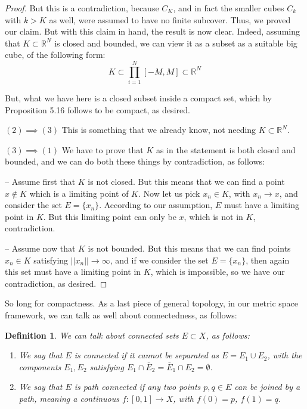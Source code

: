 \documentclass[12pt]{amsbook}
\newtheorem{definition}[theorem]{Definition}
\begin{document}
\begin{proof}
But this is a contradiction, because $C_K$, and in fact the smaller cubes $C_k$ with $k>K$ as well, were assumed to have no finite subcover. Thus, we proved our claim. But with this claim in hand, the result is now clear. Indeed, assuming that $K\subset\mathbb R^N$ is closed and bounded, we can view it as a subset as a suitable big cube, of the following form:
$$K\subset \prod_{i=1}^N[-M,M]\subset\mathbb R^N$$

But, what we have here is a closed subset inside a compact set, which by Proposition 5.16 follows to be compact, as desired.

\medskip

$(2)\implies(3)$ This is something that we already know, not needing $K\subset\mathbb R^N$.

\medskip

$(3)\implies(1)$ We have to prove that $K$ as in the statement is both closed and bounded, and we can do both these things by contradiction, as follows:

\medskip

-- Assume first that $K$ is not closed. But this means that we can find a point $x\notin K$ which is a limiting point of $K$. Now let us pick $x_n\in K$, with $x_n\to x$, and consider the set $E=\{x_n\}$. According to our assumption, $E$ must have a limiting point in $K$. But this limiting point can only be $x$, which is not in $K$, contradiction.

\medskip

-- Assume now that $K$ is not bounded. But this means that we can find points $x_n\in K$ satisfying $||x_n||\to\infty$, and if we consider the set $E=\{x_n\}$, then again this set must have a limiting point in $K$, which is impossible, so we have our contradiction, as desired.
\end{proof}

So long for compactness. As a last piece of general topology, in our metric space framework, we can talk as well about connectedness, as follows:


\begin{definition}
We can talk about connected sets $E\subset X$, as follows:
\begin{enumerate}
\item We say that $E$ is connected if it cannot be separated as $E=E_1\cup E_2$, with the components $E_1,E_2$ satisfying $E_1\cap\bar{E}_2=\bar{E}_1\cap E_2=\emptyset$.

\item We say that $E$ is path connected if any two points $p,q\in E$ can be joined by a path, meaning a continuous $f:[0,1]\to X$, with $f(0)=p$, $f(1)=q$.
\end{enumerate}
\end{definition}
\end{document}

